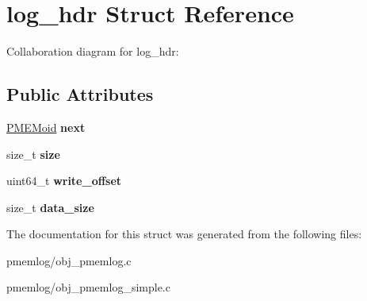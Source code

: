 \hypertarget{structlog__hdr}{}\section{log\+\_\+hdr Struct Reference}
\label{structlog__hdr}


Collaboration diagram for log\+\_\+hdr\+:
\subsection*{Public Attributes}
\begin{DoxyCompactItemize}
\item 
\mbox{\label{structlog__hdr_aa851a493b8397f8fde5dcba4313d5162}} 
\hyperlink{structpmemoid}{P\+M\+E\+Moid} {\bfseries next}
\item 
\mbox{\label{structlog__hdr_a6b95bd8b808cdb42376b4a381da228bb}} 
size\+\_\+t {\bfseries size}
\item 
\mbox{\label{structlog__hdr_ad58bd64d0602afb3eeb772045b74eb33}} 
uint64\+\_\+t {\bfseries write\+\_\+offset}
\item 
\mbox{\label{structlog__hdr_a12d9cacfaf1a9c0bfdec8f73df42ee33}} 
size\+\_\+t {\bfseries data\+\_\+size}
\end{DoxyCompactItemize}


The documentation for this struct was generated from the following files\+:\begin{DoxyCompactItemize}
\item 
pmemlog/obj\+\_\+pmemlog.\+c\item 
pmemlog/obj\+\_\+pmemlog\+\_\+simple.\+c\end{DoxyCompactItemize}
